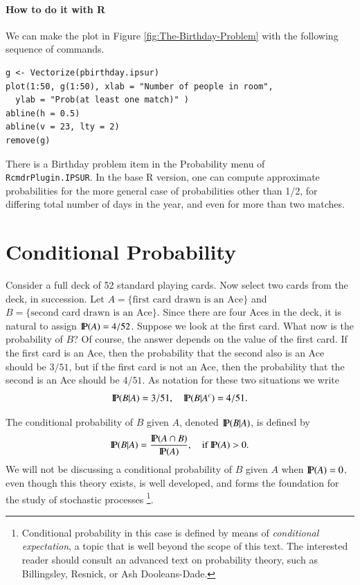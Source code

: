 \documentclass[captions=tableheading]{scrbook}
\begin{document}
\paragraph*{How to do it with \textsf{R}}

We can make the plot in Figure \ref{fig:The-Birthday-Problem} with the following sequence of commands.


\begin{verbatim}
g <- Vectorize(pbirthday.ipsur)
plot(1:50, g(1:50), xlab = "Number of people in room", 
  ylab = "Prob(at least one match)" )
abline(h = 0.5)
abline(v = 23, lty = 2)
remove(g)
\end{verbatim}

There is a \textsf{Birthday problem} item in the \textsf{Probability} menu of \texttt{RcmdrPlugin.IPSUR}. In the base \textsf{R} version, one can compute approximate probabilities for the more general case of probabilities other than 1/2, for differing total number of days in the year, and even for more than two matches.
\section{Conditional Probability}
\label{sec-3-6}

\label{sec:Conditional-Probability}

Consider a full deck of 52 standard playing cards. Now select two cards from the deck, in succession. Let \( A = \{ \mbox{first card drawn is an Ace} \} \) and \( B = \{ \mbox{second card drawn is an Ace} \} \). Since there are four Aces in the deck, it is natural to assign \( \P(A) = 4/52 \). Suppose we look at the first card. What now is the probability of \(B\)? Of course, the answer depends on the value of the first card. If the first card is an Ace, then the probability that the second also is an Ace should be \( 3/51 \), but if the first card is not an Ace, then the probability that the second is an Ace should be \( 4/51 \). As notation for these two situations we write
\[
\P(B|A)=3/51,\quad\P(B|A^{c})=4/51.
\]

\begin{defn}
The conditional probability of \(B\) given \(A\), denoted \(\P(B|A)\), is defined by
\begin{equation}
\P(B|A)=\frac{\P(A\cap B)}{\P(A)},\quad\mbox{if }\P(A)>0.
\end{equation}
We will not be discussing a conditional probability of \(B\) given \(A\) when \(\P(A)=0\), even though this theory exists, is well developed, and forms the foundation for the study of stochastic processes
\footnote{Conditional probability in this case is defined by means of \emph{conditional expectation}, a topic that is well beyond the scope of this text. The interested reader should consult an advanced text on probability theory, such as Billingsley, Resnick, or Ash Dooleans-Dade.}.
\end{defn}
\end{document}
